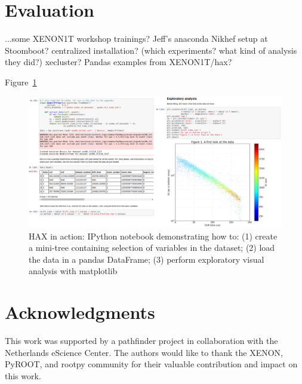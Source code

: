 \documentclass[a4paper]{jpconf}
\begin{document}
\section{Evaluation}
...some XENON1T workshop trainings?
Jeff's anaconda Nikhef setup at Stoomboot? centralized installation? (which experiments? what kind of analysis they did?) xecluster?
Pandas examples from XENON1T/hax?

Figure~\ref{fig:hax_in_action}
 
\begin{landscape}
\begin{figure}[ht]
\begin{center}
\includegraphics[width=1.05\linewidth]{./graphics/hax_in_action.png}
\caption{HAX in action: IPython notebook demonstrating how to: (1) create a mini-tree containing selection of variables in the dataset; (2) load the data in a pandas DataFrame; (3) perform exploratory visual analysis with matplotlib }
\label{fig:hax_in_action}
\end{center}
\end{figure}
\end{landscape}



\section{Acknowledgments}
This work was supported by a pathfinder project in collaboration with the Netherlands eScience Center.
The authors would like to thank the XENON, PyROOT, and rootpy community for their valuable contribution and impact on this work.
\end{document}
